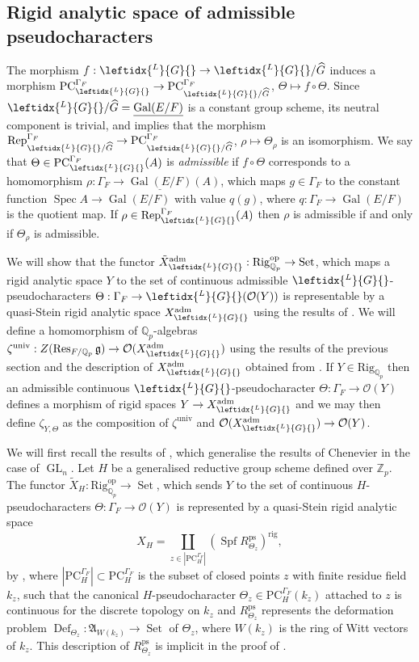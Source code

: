 \documentclass{amsart}
\theoremstyle{definition}
\theoremstyle{remark}
\DeclareMathOperator{\Res}{Res}
\DeclareMathOperator{\GL}{GL}
\DeclareMathOperator{\Gal}{Gal}
\DeclareMathOperator{\Spec}{Spec}
\DeclareMathOperator{\Rep}{Rep}
\DeclareMathOperator{\Def}{Def}
\DeclareMathOperator{\Set}{Set}
\newcommand{\Qp}{\mathbb {Q}_p}
\newcommand{\Zp}{\ZZ_p}
\newcommand{\ZZ}{\mathbb Z}
\newcommand{\OO}{\mathcal O}
\newcommand{\adm}{\mathrm{adm}}
\DeclareMathOperator{\Spf}{Spf}
\newcommand{\rig}{\mathrm{rig}}
\newcommand{\univ}{\mathrm{univ}}
\newcommand{\PC}{\mathrm{PC}}
\newcommand{\ps}{\mathrm{ps}}
\newcommand{\Ghat}{\widehat{G}}
\newcommand{\LG}{\leftidx{^L}{G}{}}
\newcommand{\Rig}{\mathrm{Rig}}
\newcommand{\op}{\mathrm{op}}
\begin{document}
 
 
\subsection{Rigid analytic space of admissible pseudocharacters}\label{adm_pseudo}
The morphism $f:\LG \rightarrow \LG/\Ghat$ induces a morphism 
$\PC^{\Gamma_F}_{\LG} \rightarrow \PC^{\Gamma_F}_{\LG/\Ghat}$, $\Theta\mapsto f\circ \Theta$.
Since $\LG/\Ghat=\underline{\Gal(E/F)}$ is a constant group scheme, its neutral component is trivial, 
and  implies 
that the 
morphism 
$\Rep^{\Gamma_F}_{\LG/\Ghat}\rightarrow  \PC^{\Gamma_F}_{\LG/\Ghat}$, $\rho \mapsto \Theta_{\rho}$  is an isomorphism. We say that $\Theta\in \PC^{\Gamma_F}_{\LG}(A)$ is \emph{admissible} if 
$f\circ \Theta$ corresponds to 
a homomorphism $\rho: \Gamma_F \rightarrow \underline{\Gal(E/F)}(A)$, which maps $g\in \Gamma_F$ to the constant function $\Spec A \rightarrow \Gal(E/F)$ with value $q(g)$, where $q: \Gamma_F\rightarrow \Gal(E/F)$ is the quotient map. If $\rho\in \Rep^{\Gamma_F}_{\LG}(A)$ then $\rho$ is admissible 
if and only if $\Theta_{\rho}$ is admissible.

We will show that the functor 
$\tilde{X}^{\adm}_{\LG}: \Rig_{\Qp}^{\op}\rightarrow \Set$, which 
maps a rigid analytic space $Y$ to the set of continuous admissible $\LG$-pseudocharacters $\Theta: \Gamma_F\rightarrow \LG(\OO(Y))$ is representable by a quasi-Stein rigid 
analytic space $X^{\adm}_{\LG}$ using the results of \cite{quast}. We will define a homomorphism 
of $\Qp$-algebras $\zeta^{\univ}: Z(\Res_{F/\Qp} \mathfrak g)\rightarrow \OO(X^{\adm}_{\LG})$ using the results 
of the previous section and the description of $X^{\adm}_{\LG}$ obtained from \cite{quast}. If $Y\in \Rig_{\Qp}$ then an admissible continuous $\LG$-pseudocharacter 
$\Theta: \Gamma_F \rightarrow \OO(Y)$ defines a morphism 
of rigid spaces $Y\rightarrow X^{\adm}_{\LG}$ and 
we may then define $\zeta_{Y,\Theta}$ as the composition 
of $\zeta^{\univ}$ and $\OO(X^{\adm}_{\LG})\rightarrow \OO(Y)$. 

We will first recall the results of \cite[Section 6]{quast}, 
which generalise the results of Chenevier \cite{che_durham} in the case of $\GL_n$. Let $H$ be a generalised reductive group 
scheme defined over $\Zp$. The functor $\tilde{X}_H: \Rig_{\Qp}^{\op}\rightarrow \Set$, which sends $Y$ to the 
set of continuous $H$-pseudocharacters $\Theta: \Gamma_F \rightarrow \OO(Y)$ is represented by a quasi-Stein rigid 
analytic space 
\begin{equation}\label{XH}
X_H= \coprod_{z\in |\PC^{\Gamma_F}_H|} (\Spf R^{\ps}_{\Theta_z})^{\rig},
\end{equation}
by \cite[Theorem 6.19]{quast}, where 
$|\PC^{\Gamma_F}_H|\subset \PC^{\Gamma_F}_H$ is the subset of closed points $z$ with finite residue field $k_z$, such that the canonical $H$-pseudocharacter $\Theta_z\in \PC^{\Gamma_F}_H(k_z)$ attached to $z$ is continuous for the discrete topology on $k_z$ and $R^{\ps}_{\Theta_z}$ 
represents the deformation problem $\Def_{\Theta_z}: \mathfrak A_{W(k_z)}\rightarrow \Set$ of $\Theta_z$, 
where $W(k_z)$ is the ring of Witt vectors of $k_z$. 
This description of $R^{\ps}_{\Theta_z}$ is implicit in the proof of \cite[Theorem 6.19]{quast}.
\end{document}
